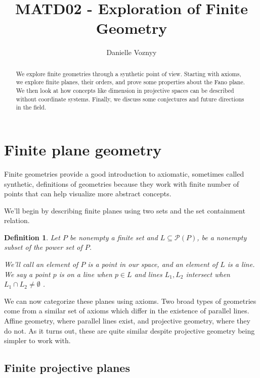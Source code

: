 \documentclass[12pt]{article}
\title{MATD02 - Exploration of Finite Geometry }
\author{Danielle Voznyy}
\date{}
\newtheorem{definition}{Definition}
\begin{document}
    \maketitle

    \begin{abstract}
        We explore finite geometries through a synthetic point of view.
        Starting with axioms, we explore finite planes, their orders, and prove some properties about the Fano plane.
        We then look at how concepts like dimension in projective spaces can be described without coordinate systems.
        Finally, we discuss some conjectures and future directions in the field.
    \end{abstract}


    \section{Finite plane geometry}

    Finite geometries provide a good introduction to axiomatic, sometimes called synthetic, definitions of geometries
    because they work with finite number of points that can help visualize more abstract concepts.

    We'll begin by describing finite planes using two sets and the set containment relation.

    \begin{definition}
        Let $P$ be nonempty a finite set and $L \subseteq \mathcal{P}(P)$, be a nonempty subset of the power set of $P$.

        We'll call an element of $P$ is a point in our space, and an element of $L$ is a line.
        We say a point $p$ is on a line when $p \in L$ and lines $L_1, L_2$ intersect when $L_1 \cap L_2 \neq \emptyset$
        .
    \end{definition}

    We can now categorize these planes using axioms.
    Two broad types of geometries come from a similar set of axioms which differ in the existence of parallel lines.
    Affine geometry, where parallel lines exist, and projective geometry, where they do not.
    As it turns out, these are quite similar despite projective geometry being simpler to work with\cite[p.~7]{beutelspacher_projective_2000}.

    \subsection{Finite projective planes}
\end{document}

